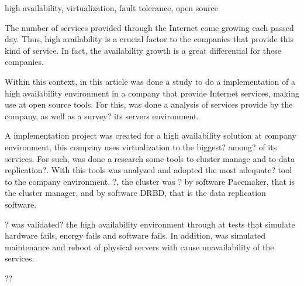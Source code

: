 \begin{englishabstract}{}{high availability, virtualization, fault tolerance, open source}

The number of services provided through the Internet come growing each passed day. Thus, high availability is a crucial factor to the 
companies that provide this kind of service. In fact, the availability growth is a great differential for these companies.

Within this context, in this article was done a study to do a implementation of a high availability environment in a company that provide 
Internet services, making use at open source tools. For this, was done a analysis of services provide by the company, 
as well as a survey? its servers environment.

A implementation project was created for a high availability solution at company environment, this company uses virtualization to the biggest?
among? of its services. For such, was done a research some tools to cluster manage and to data replication?. With this tools was analyzed and 
adopted the most adequate? tool to the company environment. ?, the cluster was ? by software Pacemaker, that is the cluster manager, and by 
software DRBD, that is the data replication software.

? was validated? the high availability environment through at tests that simulate hardware fails, energy fails and software fails. 
In addition, was simulated maintenance and reboot of physical servers with cause unavailability of the services.

??

\end{englishabstract}
